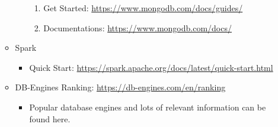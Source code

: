 \documentclass{article}
\begin{document}
\begin{enumerate}
\begin{itemize}
\begin{itemize}
            \begin{enumerate}
                \item Get Started:
                \href{https://www.mongodb.com/docs/guides/}{https://www.mongodb.com/docs/guides/}
                \item Documentations:
                \href{https://www.mongodb.com/docs/}{https://www.mongodb.com/docs/}
            \end{enumerate}
        \end{itemize}
        \item Spark
        \begin{itemize}
            \item Quick Start:
            \href{https://spark.apache.org/docs/latest/quick-start.html}{https://spark.apache.org/docs/latest/quick-start.html}
        \end{itemize}
        \item DB-Engines Ranking:
            \href{https://db-engines.com/en/ranking}{https://db-engines.com/en/ranking}
            \begin{itemize}
                \item Popular database engines and lots of relevant information can be found here.
            \end{itemize}        
    \end{itemize}


\end{enumerate}
\end{document}

